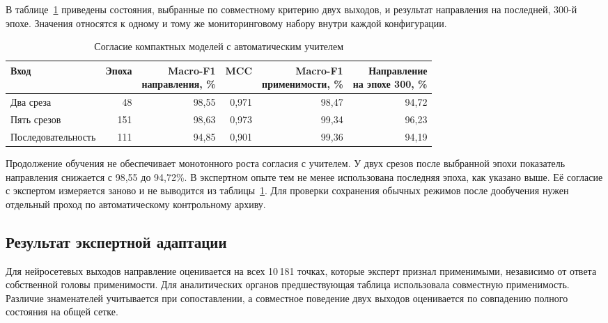 В таблице~\ref{tab:ch5_weak_monitoring} приведены состояния,
выбранные по совместному критерию двух выходов,
и результат направления на последней, 300-й эпохе.
Значения относятся к одному и тому же мониторинговому набору
внутри каждой конфигурации.

\begin{table}[htbp]
\centering\small
\caption{Согласие компактных моделей с автоматическим учителем}
\label{tab:ch5_weak_monitoring}
\setlength{\tabcolsep}{5.5pt}
\begin{tabular}{lrrrrr}
\toprule
Вход & Эпоха & \shortstack{Macro-F1\\направления, \%}
 & MCC & \shortstack{Macro-F1\\применимости, \%}
 & \shortstack{Направление\\на эпохе 300, \%} \\
\midrule
Два среза & 48 & 98,55 & 0,971 & 98,47 & 94,72 \\
Пять срезов & 151 & 98,63 & 0,973 & 99,34 & 96,23 \\
Последовательность & 111 & 94,85 & 0,901 & 99,36 & 94,19 \\
\bottomrule
\end{tabular}
\end{table}

Продолжение обучения не обеспечивает монотонного
роста согласия с учителем. У двух срезов после выбранной
эпохи показатель направления снижается с 98,55 до 94,72\%.
В экспертном опыте тем не менее использована последняя эпоха,
как указано выше. Её согласие с экспертом измеряется заново
и не выводится из таблицы~\ref{tab:ch5_weak_monitoring}.
Для проверки сохранения обычных режимов после дообучения
нужен отдельный проход по автоматическому контрольному архиву.

\subsection{Результат экспертной адаптации}

{}

Для нейросетевых выходов направление оценивается
на всех 10\,181 точках, которые эксперт признал применимыми,
независимо от ответа собственной головы применимости.
Для аналитических органов предшествующая таблица
использовала совместную применимость.
Различие знаменателей учитывается при сопоставлении,
а совместное поведение двух выходов оценивается
по совпадению полного состояния на общей сетке.

